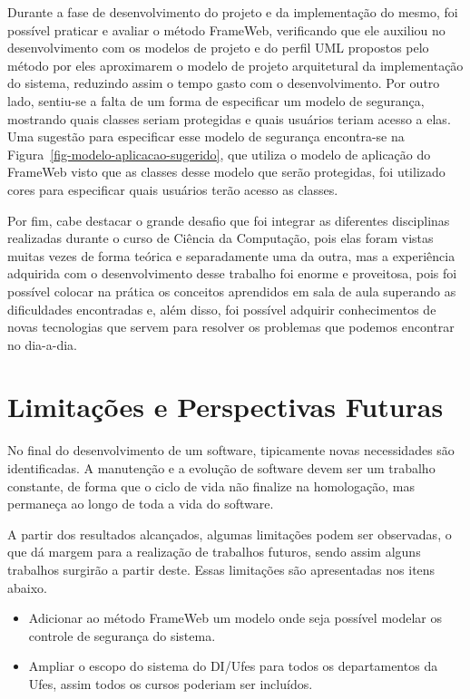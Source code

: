 Durante a fase de desenvolvimento do projeto e da implementação do mesmo, foi possível praticar e avaliar o método FrameWeb, verificando que ele auxiliou no desenvolvimento com os modelos de projeto e do perfil UML propostos pelo método por eles aproximarem o modelo de projeto arquitetural da implementação do sistema, reduzindo assim o tempo gasto com o desenvolvimento. Por outro lado, sentiu-se a falta de um forma de especificar um modelo de segurança, mostrando quais classes seriam protegidas e quais usuários teriam acesso a elas. Uma sugestão para especificar esse modelo de segurança encontra-se na Figura~\ref{fig-modelo-aplicacao-sugerido}, que utiliza o modelo de aplicação do FrameWeb visto que as classes desse modelo que serão protegidas, foi utilizado cores para especificar quais usuários terão acesso as classes.


Por fim, cabe destacar o grande desafio que foi integrar as diferentes disciplinas realizadas durante o curso de Ciência da Computação, pois elas foram vistas muitas vezes de forma teórica e separadamente uma da outra, mas a experiência adquirida com o desenvolvimento desse trabalho foi enorme e proveitosa, pois foi possível colocar na prática os conceitos aprendidos em sala de aula superando as dificuldades encontradas e, além disso, foi possível adquirir conhecimentos de novas tecnologias que servem para resolver os problemas que podemos encontrar no dia-a-dia.




\section{Limitações e Perspectivas Futuras}
\label{sec-consideracoes-finais-limitacoes-perspectivas}

No final do desenvolvimento de um software, tipicamente novas necessidades são identificadas. A manutenção e a evolução de software devem ser um trabalho constante, de forma que o ciclo de vida não finalize na homologação, mas permaneça ao longo de toda a vida do software.

A partir dos resultados alcançados, algumas limitações podem ser observadas, o que dá margem para a realização de trabalhos futuros, sendo assim alguns trabalhos surgirão a partir deste. Essas limitações são apresentadas nos itens abaixo.

\begin{itemize}

	\item Adicionar ao método FrameWeb um modelo onde seja possível modelar os controle de segurança do sistema. 
	
	\item Ampliar o escopo do sistema do DI/Ufes para todos os departamentos da Ufes, assim todos os cursos poderiam ser incluídos.
	
\end{itemize}


